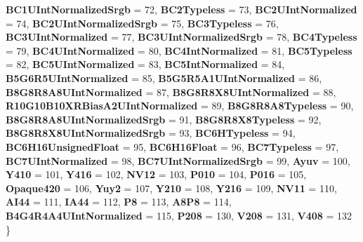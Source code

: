 \begin{DoxyCompactItemize}
\newline
{\bfseries B\+C1\+U\+Int\+Normalized\+Srgb} = 72, 
{\bfseries B\+C2\+Typeless} = 73, 
{\bfseries B\+C2\+U\+Int\+Normalized} = 74, 
{\bfseries B\+C2\+U\+Int\+Normalized\+Srgb} = 75, 
\newline
{\bfseries B\+C3\+Typeless} = 76, 
{\bfseries B\+C3\+U\+Int\+Normalized} = 77, 
{\bfseries B\+C3\+U\+Int\+Normalized\+Srgb} = 78, 
{\bfseries B\+C4\+Typeless} = 79, 
\newline
{\bfseries B\+C4\+U\+Int\+Normalized} = 80, 
{\bfseries B\+C4\+Int\+Normalized} = 81, 
{\bfseries B\+C5\+Typeless} = 82, 
{\bfseries B\+C5\+U\+Int\+Normalized} = 83, 
\newline
{\bfseries B\+C5\+Int\+Normalized} = 84, 
{\bfseries B5\+G6\+R5\+U\+Int\+Normalized} = 85, 
{\bfseries B5\+G5\+R5\+A1\+U\+Int\+Normalized} = 86, 
{\bfseries B8\+G8\+R8\+A8\+U\+Int\+Normalized} = 87, 
\newline
{\bfseries B8\+G8\+R8\+X8\+U\+Int\+Normalized} = 88, 
{\bfseries R10\+G10\+B10\+X\+R\+Bias\+A2\+U\+Int\+Normalized} = 89, 
{\bfseries B8\+G8\+R8\+A8\+Typeless} = 90, 
{\bfseries B8\+G8\+R8\+A8\+U\+Int\+Normalized\+Srgb} = 91, 
\newline
{\bfseries B8\+G8\+R8\+X8\+Typeless} = 92, 
{\bfseries B8\+G8\+R8\+X8\+U\+Int\+Normalized\+Srgb} = 93, 
{\bfseries B\+C6\+H\+Typeless} = 94, 
{\bfseries B\+C6\+H16\+Unsigned\+Float} = 95, 
\newline
{\bfseries B\+C6\+H16\+Float} = 96, 
{\bfseries B\+C7\+Typeless} = 97, 
{\bfseries B\+C7\+U\+Int\+Normalized} = 98, 
{\bfseries B\+C7\+U\+Int\+Normalized\+Srgb} = 99, 
\newline
{\bfseries Ayuv} = 100, 
{\bfseries Y410} = 101, 
{\bfseries Y416} = 102, 
{\bfseries N\+V12} = 103, 
\newline
{\bfseries P010} = 104, 
{\bfseries P016} = 105, 
{\bfseries Opaque420} = 106, 
{\bfseries Yuy2} = 107, 
\newline
{\bfseries Y210} = 108, 
{\bfseries Y216} = 109, 
{\bfseries N\+V11} = 110, 
{\bfseries A\+I44} = 111, 
\newline
{\bfseries I\+A44} = 112, 
{\bfseries P8} = 113, 
{\bfseries A8\+P8} = 114, 
{\bfseries B4\+G4\+R4\+A4\+U\+Int\+Normalized} = 115, 
\newline
{\bfseries P208} = 130, 
{\bfseries V208} = 131, 
{\bfseries V408} = 132
 \}
\item 
\mbox{\label{namespace_windows_1_1_graphics_1_1_direct_x_af123b0bc9a4738d81ccfc0ea3154e8d2}} 

\end{DoxyCompactItemize}
